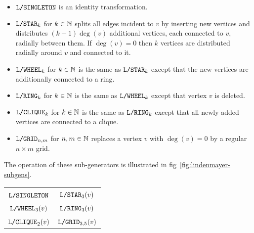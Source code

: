 \documentclass{graphstudy}
\begin{document}
\begin{itemize}
\item \(\menum{L/SINGLETON}\) is an identity transformation.
\item \(\menum{L/STAR}_k\) for \(k\in\mathbb{N}\) splits all edges incident to \(v\) by inserting new vertices and
  distributes \((k-1)\deg(v)\) additional vertices, each connected to \(v\), radially between them.  If \(\deg(v)=0\)
  then \(k\) vertices are distributed radially around \(v\) and connected to it.
\item \(\menum{L/WHEEL}_k\) for \(k\in\mathbb{N}\) is the same as \(\menum{L/STAR}_k\) except that the new vertices are
  additionally connected to a ring.
\item \(\menum{L/RING}_k\) for \(k\in\mathbb{N}\) is the same as \(\menum{L/WHEEL}_k\) except that vertex \(v\) is deleted.
\item \(\menum{L/CLIQUE}_k\) for \(k\in\mathbb{N}\) is the same as \(\menum{L/RING}_k\) except that all newly added vertices
  are connected to a clique.
\item \(\menum{L/GRID}_{n,m}\) for \(n,m\in\mathbb{N}\) replaces a vertex \(v\) with \(\deg(v)=0\) by a regular
  \(n\times{}m\) grid.
\end{itemize}

The operation of these sub-generators is illustrated in \acl{fig}~\ref{fig:lindenmayer-subgens}.

\begin{Figure}
  \begin{center}
    \begin{tabular}{c@{\qquad\qquad}c}
       & \\
      \(\menum{L/SINGLETON}\) & \(\mbox{\text{\upshape\ttfamily L/STAR}}_3(v)\)\\[2ex]
       & \\
      \(\mbox{\text{\upshape\ttfamily L/WHEEL}}_3(v)\) & \(\mbox{\text{\upshape\ttfamily L/RING}}_3(v)\)\\[2ex]
       & \\
      \(\mbox{\text{\upshape\ttfamily L/CLIQUE}}_2(v)\) & \(\mbox{\text{\upshape\ttfamily L/GRID}}_{3,5}(v)\)\\
    \end{tabular}
  \end{center}
  \caption[%
     sub-generators \(\menum{L/SINGLETON}\), \(\menum{L/STAR}_k\), \(\menum{L/WHEEL}_k\),
    \(\menum{L/RING}_k\), \(\menum{L/CLIQUE}_k\) and \(\menum{L/GRID}_{n,m}\)
  ]{%
    Operation of the  sub-generators on a vertex \(v\) adjacent to four vertices \(u_1,\ldots,u_4\)
    illustrated; except for the \(\menum{L/GRID}_{n,m}\) example where \(\deg(v)=0\) initially as required for its
    applicability.  (Hence the grid is not connected to any other node after the operation has completed either.)
  }
  \label{fig:lindenmayer-subgens}
\end{Figure}
\end{document}
